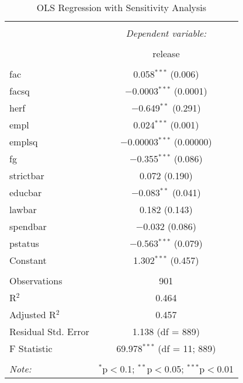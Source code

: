 
\begin{table}[!htbp] \centering 
  \caption{OLS Regression with Sensitivity Analysis} 
  \label{} 
\begin{tabular}{@{\extracolsep{5pt}}lc} 
\\[-1.8ex]\hline 
\hline \\[-1.8ex] 
 & \multicolumn{1}{c}{\textit{Dependent variable:}} \\ 
\cline{2-2} 
\\[-1.8ex] & release \\ 
\hline \\[-1.8ex] 
 fac & 0.058$^{***}$ (0.006) \\ 
  facsq & $-$0.0003$^{***}$ (0.0001) \\ 
  herf & $-$0.649$^{**}$ (0.291) \\ 
  empl & 0.024$^{***}$ (0.001) \\ 
  emplsq & $-$0.00003$^{***}$ (0.00000) \\ 
  fg & $-$0.355$^{***}$ (0.086) \\ 
  strictbar & 0.072 (0.190) \\ 
  educbar & $-$0.083$^{**}$ (0.041) \\ 
  lawbar & 0.182 (0.143) \\ 
  spendbar & $-$0.032 (0.086) \\ 
  pstatus & $-$0.563$^{***}$ (0.079) \\ 
  Constant & 1.302$^{***}$ (0.457) \\ 
 \hline \\[-1.8ex] 
Observations & 901 \\ 
R$^{2}$ & 0.464 \\ 
Adjusted R$^{2}$ & 0.457 \\ 
Residual Std. Error & 1.138 (df = 889) \\ 
F Statistic & 69.978$^{***}$ (df = 11; 889) \\ 
\hline 
\hline \\[-1.8ex] 
\textit{Note:}  & \multicolumn{1}{r}{$^{*}$p$<$0.1; $^{**}$p$<$0.05; $^{***}$p$<$0.01} \\ 
\end{tabular} 
\end{table} 
